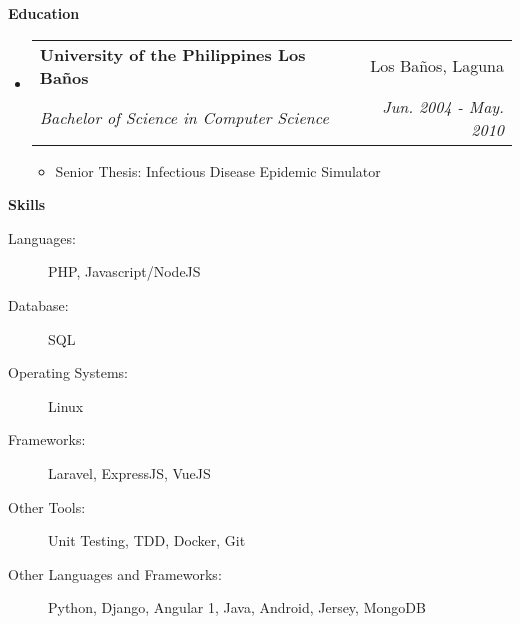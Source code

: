\documentclass[letterpaper,11pt]{article}
\makeatletter
\newcommand{\resitem}[1]{\item #1 \vspace{-2pt}}
\newcommand{\resheading}[1]{{\large \colorbox{mygrey}{\begin{minipage}{\textwidth}{\textbf{#1 \vphantom{p\^{E}}}}\end{minipage}}}}
\newcommand{\ressubheading}[4]{
\begin{tabular*}{7.0in}{l@{\extracolsep{\fill}}r}
		\textbf{#1} & #2 \\
		\textit{#3} & \textit{#4} \\
\end{tabular*}\vspace{-6pt}}
\makeatother
\begin{document}
\resheading{Education}
\begin{itemize}
\item
	\ressubheading{University of the Philippines Los Ba\~nos}{Los Ba\~nos, Laguna}{Bachelor of Science in Computer Science}{Jun. 2004 - May. 2010}
	\begin{itemize}
		\resitem{Senior Thesis: Infectious Disease Epidemic Simulator}
	\end{itemize}

\end{itemize}

\resheading{Skills}

\begin{description}
\item[Languages:]
PHP, Javascript/NodeJS
\item[Database:]
SQL
\item[Operating Systems:]
Linux 
\item[Frameworks:]
Laravel, ExpressJS, VueJS
\item[Other Tools:]
Unit Testing, TDD, Docker, Git
\item[Other Languages and Frameworks:]
Python, Django, Angular 1, Java, Android, Jersey, MongoDB
\end{description}

\pagebreak
\end{document}
